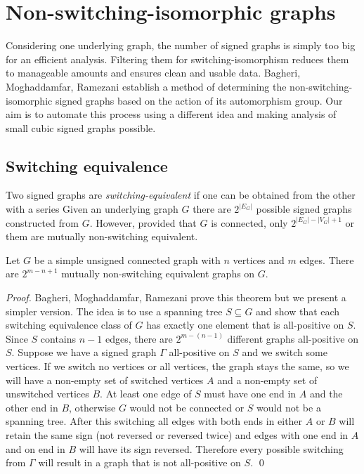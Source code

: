 \chapter{Non-switching-isomorphic graphs}

Considering one underlying graph, the number of signed graphs is simply too big for an efficient analysis. Filtering them for switching-isomorphism reduces them to manageable amounts and ensures clean and usable data. Bagheri, Moghaddamfar, Ramezani\cite{switching-isomorphic} establish a method of determining the non-switching-isomorphic signed graphs based on the action of its automorphism group. Our aim is to automate this process using a different idea and making analysis of small cubic signed graphs possible.

\section{Switching equivalence}

Two signed graphs are \textit{switching-equivalent} if one can be obtained from the other with a series Given an underlying graph $G$ there are $2^{|E_G|}$ possible signed graphs constructed from $G$. However, provided that $G$ is connected, only $2^{|E_G| - |V_G| + 1}$ or them are mutually non-switching equivalent.

\begin{theorem}\label{lem1:eq-classes}
    Let $G$ be a simple unsigned connected graph with $n$ vertices and $m$ edges. There are $2^{m - n + 1}$ mutually non-switching equivalent graphs on $G$.
\end{theorem}

\textit{Proof.} Bagheri, Moghaddamfar, Ramezani\cite{switching-isomorphic} prove this theorem but we present a simpler version. The idea is to use a spanning tree $S \subseteq G$ and show that each switching equivalence class of $G$ has exactly one element that is all-positive on $S$. Since $S$ contains $n - 1$ edges, there are $2^{m - (n - 1)}$ different graphs all-positive on $S$. Suppose we have a signed graph $\Gamma$ all-positive on $S$ and we switch some vertices. If we switch no vertices or all vertices, the graph stays the same, so we will have a non-empty set of switched vertices $A$ and a non-empty set of unswitched vertices $B$. At least one edge of $S$ must have one end in $A$ and the other end in $B$, otherwise $G$ would not be connected or $S$ would not be a spanning tree. After this switching all edges with both ends in either $A$ or $B$ will retain the same sign (not reversed or reversed twice) and edges with one end in $A$ and on end in $B$ will have its sign reversed. Therefore every possible switching from $\Gamma$ will result in a graph that is not all-positive on $S$. \qed

